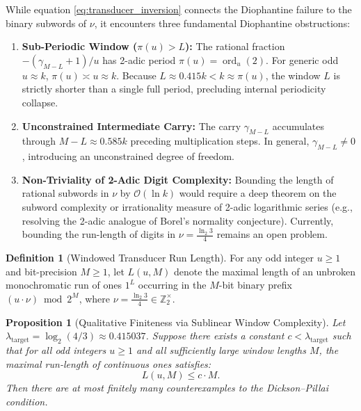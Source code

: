 \documentclass[11pt,reqno]{amsart}
\newtheorem{proposition}[theorem]{Proposition}
\theoremstyle{definition}
\newtheorem{definition}[theorem]{Definition}
\numberwithin{equation}{section}
\begin{document}
While equation \eqref{eq:transducer_inversion} connects the Diophantine failure to the binary subwords of $\nu$, it encounters three fundamental Diophantine obstructions:
\begin{enumerate}
    \item \textbf{Sub-Periodic Window ($\pi(u) > L$):} The rational fraction $-( \gamma_{M-L} + 1)/u$ has 2-adic period $\pi(u) = \operatorname{ord}_u(2)$. For generic odd $u \approx k$, $\pi(u) \asymp u \approx k$. Because $L \approx 0.415 k < k \approx \pi(u)$, the window $L$ is strictly shorter than a single full period, precluding internal periodicity collapse.
    \item \textbf{Unconstrained Intermediate Carry:} The carry $\gamma_{M-L}$ accumulates through $M - L \approx 0.585 k$ preceding multiplication steps. In general, $\gamma_{M-L} \ne 0$, introducing an unconstrained degree of freedom.
    \item \textbf{Non-Triviality of 2-Adic Digit Complexity:} Bounding the length of rational subwords in $\nu$ by $\mathcal{O}(\ln k)$ would require a deep theorem on the subword complexity or irrationality measure of 2-adic logarithmic series (e.g., resolving the 2-adic analogue of Borel's normality conjecture). Currently, bounding the run-length of digits in $\nu = \frac{\ln_2 3}{4}$ remains an open problem.
\end{enumerate}

\begin{definition}[Windowed Transducer Run Length]
For any odd integer $u \ge 1$ and bit-precision $M \ge 1$, let $L(u, M)$ denote the maximal length of an unbroken monochromatic run of ones $1^L$ occurring in the $M$-bit binary prefix $(u \cdot \nu) \bmod 2^M$, where $\nu = \frac{\ln_2 3}{4} \in \mathbb{Z}_2^\times$.
\end{definition}

\begin{proposition}[Qualitative Finiteness via Sublinear Window Complexity]\label{prop:qualitative_finiteness}
Let $\lambda_{\mathrm{target}} = \log_2(4/3) \approx 0.415037$. Suppose there exists a constant $c < \lambda_{\mathrm{target}}$ such that for all odd integers $u \ge 1$ and all sufficiently large window lengths $M$, the maximal run-length of continuous ones satisfies:
\begin{equation}\label{eq:window_complexity_bound}
L(u, M) \le c \cdot M.
\end{equation}
Then there are at most finitely many counterexamples to the Dickson--Pillai condition.
\end{proposition}
\end{document}
